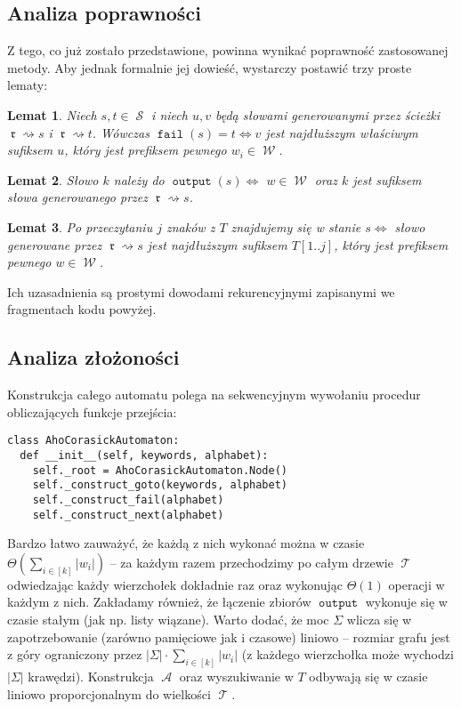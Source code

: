 \documentclass{article}
\newtheorem*{lemma}{Lemat}
\DeclareMathOperator{\rot}{\mathfrak{r}}
\DeclareMathOperator{\W}{\mathcal{W}}
\DeclareMathOperator{\A}{\mathcal{A}}
\DeclareMathOperator{\states}{\mathcal{S}}
\DeclareMathOperator{\trie}{\mathcal{T}}
\DeclareMathOperator{\fail}{\texttt{fail}}
\DeclareMathOperator{\out}{\texttt{output}}
\begin{document}
\subsection{Analiza poprawności}
Z tego, co już zostało przedstawione, powinna wynikać poprawność zastosowanej metody. Aby jednak formalnie jej dowieść, wystarczy postawić trzy proste lematy:

\begin{lemma}
Niech $s,t\in\states$ i niech $u, v$ będą słowami generowanymi przez ścieżki $\rot\rightsquigarrow s$ i $\rot\rightsquigarrow t$. Wówczas $\fail(s) = t \iff v$ jest najdłuższym właściwym sufiksem $u$, który jest prefiksem pewnego $w_i\in\W$.
\end{lemma}

\begin{lemma}
Słowo $k$ należy do $\out(s)\iff$ $w\in\W$ oraz $k$ jest sufiksem słowa generowanego przez $\rot\rightsquigarrow s$.
\end{lemma}

\begin{lemma}
Po przeczytaniu $j$ znaków z $T$ znajdujemy się w stanie $s\iff$ słowo generowane przez $\rot\rightsquigarrow s$ jest najdłuższym sufiksem $T[1..j]$, który jest prefiksem pewnego $w\in\W$.
\end{lemma}

\noindent Ich uzasadnienia są prostymi dowodami rekurencyjnymi zapisanymi we fragmentach kodu powyżej.

\subsection{Analiza złożoności}
Konstrukcja całego automatu polega na sekwencyjnym wywołaniu procedur obliczających funkcje przejścia:

\begin{verbatim}
class AhoCorasickAutomaton:
  def __init__(self, keywords, alphabet):
    self._root = AhoCorasickAutomaton.Node()
    self._construct_goto(keywords, alphabet)
    self._construct_fail(alphabet)
    self._construct_next(alphabet)
\end{verbatim}

Bardzo łatwo zauważyć, że każdą z nich wykonać można w czasie $\Theta(\sum_{i\in[k]}|w_i|)$ -- za każdym razem przechodzimy po całym drzewie $\trie$ odwiedzając każdy wierzchołek dokładnie raz oraz wykonując $\Theta(1)$ operacji w każdym z nich. Zakładamy również, że łączenie zbiorów $\out$ wykonuje się w czasie stałym (jak np. listy wiązane). Warto dodać, że moc $\Sigma$ wlicza się w zapotrzebowanie (zarówno pamięciowe jak i czasowe) liniowo -- rozmiar grafu jest z góry ograniczony przez $|\Sigma|\cdot \sum_{i\in[k]}|w_i|$ (z każdego wierzchołka może wychodzi $|\Sigma|$ krawędzi). Konstrukcja $\A$ oraz wyszukiwanie w $T$ odbywają się w czasie liniowo proporcjonalnym do wielkości $\trie$.
\end{document}
